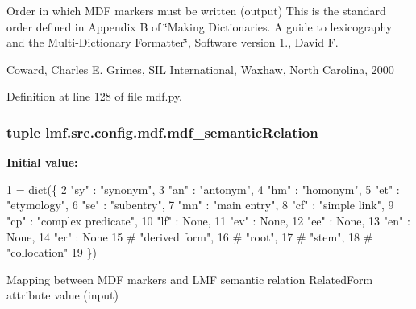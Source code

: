 Order in which M\+D\+F markers must be written (output) This is the standard order defined in Appendix B of \char`\"{}\+Making Dictionaries. A guide to lexicography and the Multi-\/\+Dictionary Formatter\char`\"{}, Software version 1., David F. 

Coward, Charles E. Grimes, S\+I\+L International, Waxhaw, North Carolina, 2000 

Definition at line 128 of file mdf.\+py.

\hypertarget{namespacelmf_1_1src_1_1config_1_1mdf_a20455cbc7aa64cc6eb4ad1749a381738}{
\subsubsection[{mdf\+\_\+semantic\+Relation}]{\setlength{\rightskip}{0pt plus 5cm}tuple lmf.\+src.\+config.\+mdf.\+mdf\+\_\+semantic\+Relation}}\label{namespacelmf_1_1src_1_1config_1_1mdf_a20455cbc7aa64cc6eb4ad1749a381738}
{\bfseries Initial value\+:}
\begin{DoxyCode}
1 = dict(\{
2     \textcolor{stringliteral}{"sy"} : \textcolor{stringliteral}{"synonym"},
3     \textcolor{stringliteral}{"an"} : \textcolor{stringliteral}{"antonym"},
4     \textcolor{stringliteral}{"hm"} : \textcolor{stringliteral}{"homonym"},
5     \textcolor{stringliteral}{"et"} : \textcolor{stringliteral}{"etymology"},
6     \textcolor{stringliteral}{"se"} : \textcolor{stringliteral}{"subentry"},
7     \textcolor{stringliteral}{"mn"} : \textcolor{stringliteral}{"main entry"},
8     \textcolor{stringliteral}{"cf"} : \textcolor{stringliteral}{"simple link"},
9     \textcolor{stringliteral}{"cp"} : \textcolor{stringliteral}{"complex predicate"},
10     \textcolor{stringliteral}{"lf"} : \textcolor{keywordtype}{None},
11     \textcolor{stringliteral}{"ev"} : \textcolor{keywordtype}{None},
12     \textcolor{stringliteral}{"ee"} : \textcolor{keywordtype}{None},
13     \textcolor{stringliteral}{"en"} : \textcolor{keywordtype}{None},
14     \textcolor{stringliteral}{"er"} : \textcolor{keywordtype}{None}
15     \textcolor{comment}{# "derived form",}
16     \textcolor{comment}{# "root",}
17     \textcolor{comment}{# "stem",}
18     \textcolor{comment}{# "collocation"}
19 \})
\end{DoxyCode}


Mapping between M\+D\+F markers and L\+M\+F semantic relation Related\+Form attribute value (input) 



